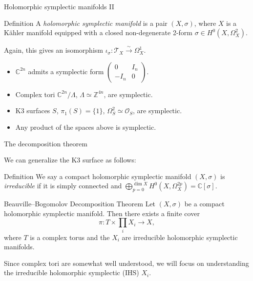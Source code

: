 \documentclass{beamer}
\begin{document}
\begin{frame}{Holomorphic symplectic manifolds II}

\begin{block}{Definition}
A {\it holomorphic symplectic manifold} is a pair \((X, \sigma)\), where \(X\) is a 
K\"ahler manifold equipped with a closed non-degenerate 2-form 
\(\sigma \in H^0(X, \Omega_X^2)\).
\end{block}

\pause
Again, this gives an isomorphism 
\(\iota_\sigma: \mathcal{T}_X \xrightarrow{\sim} \Omega_X^1\).
\pause

\begin{examples}
    \begin{itemize}
        \item<3-> \(\mathbb{C}^{2n}\) admits a symplectic form \(\begin{pmatrix}
        0 & I_n \\ -I_n & 0
        \end{pmatrix}\).
        \item<4-> Complex tori \(\mathbb{C}^{2n}/\Lambda\), 
        \(\Lambda \simeq \mathbb{Z}^{4n}\), are symplectic.
        \item<5-> K3 surfaces \(S\), \(\pi_1(S) = \{1\}\), \(\Omega_S^2 \simeq \mathcal{O}_S\), 
        are symplectic.
        \item<6-> Any product of the spaces above is symplectic.
    \end{itemize}
\end{examples}

\end{frame}



\begin{frame}{The decomposition theorem}

We can generalize the K3 surface as follows:

\begin{block}{Definition}
    We say a compact holomorphic symplectic manifold \((X, \sigma)\) is 
    {\it irreducible} if it is simply connected and 
    \(\bigoplus_{p=0}^{\dim X} H^0(X, \Omega_X^{2p}) = \mathbb{C}[\sigma]\).
\end{block}
\pause

\begin{block}{Beauville--Bogomolov Decomposition Theorem}
    Let \((X, \sigma)\) be a compact holomorphic symplectic manifold. Then there exists 
    a finite cover \[\pi: T \times \prod_i X_i \to X,\]
    where \(T\) is a complex torus and the \(X_i\) are irreducible holomorphic 
    symplectic manifolds. 
\end{block}
\pause

Since complex tori are somewhat well understood, we will focus on understanding 
the irreducible holomorphic symplectic (IHS) \(X_i\).

\end{frame}
\end{document}
